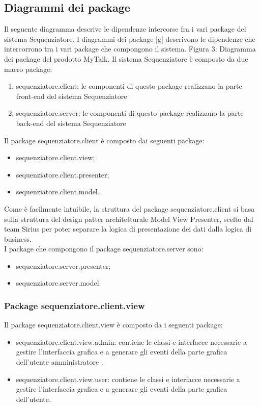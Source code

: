 \subsection{Diagrammi dei package}
Il seguente diagramma descrive le dipendenze intercorse fra i vari package del sistema Sequenziatore.
I diagrammi dei package |g| descrivono le dipendenze che intercorrono tra i vari
package che compongono il sistema.
Figura 3: Diagramma dei package del prodotto MyTalk.
Il sistema Sequenziatore è composto da due macro package:
\begin{enumerate}
	\item sequenziatore.client: le componenti di questo package realizzano la parte front-end del sistema Sequenziatore 
	\item sequenziatore.server: le componenti di questo package realizzano la parte back-end del sistema Sequenziatore 
\end{enumerate}
Il package sequenziatore.client è composto dai seguenti package:
\begin{itemize}
	\item sequenziatore.client.view;
	\item sequenziatore.client.presenter;
	\item sequenziatore.client.model.
\end{itemize}
Come è facilmente intuibile, la struttura del package sequenziatore.client si basa sulla struttura del design patter
architetturale Model View Presenter, scelto dal team Sirius per poter separare la logica di presentazione dei dati dalla logica di business.\\
I package che compongono il package sequenziatore.server sono:
\begin{itemize}
	\item sequenziatore.server.presenter;
	\item sequenziatore.server.model.
\end{itemize}
\subsubsection{Package sequenziatore.client.view}
Il package sequenziatore.client.view è composto da i seguenti package:
\begin{itemize}
	\item sequenziatore.client.view.admin: contiene le classi e interfacce necessarie a gestire 
l’interfaccia grafica e a generare gli eventi della parte grafica dell'utente amministratore .
	\item sequenziatore.client.view.user: contiene le classi e interfacce necessarie a gestire l’interfaccia
grafica e a generare gli eventi della parte grafica dell’utente.
\end{itemize}
